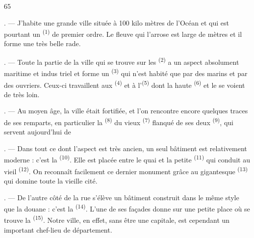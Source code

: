 \begin{VUpage}[67]{65}
\VUsaut{2.0mm}
\VUsaut{3.0mm}
\VUfilet{16mm}
\VUsaut{5.6mm}
\VUsaut{1.4mm}
\VUsaut{2.2mm}

. --- J'habite une grande ville située à 100 kilo\cc
mètres de l'Océan et qui est pourtant un \textsuperscript{(1)} de\nl
premier ordre. Le fleuve qui l'arrose est large de mètres et il forme une très belle rade.

. --- Toute la partie de la ville qui se trouve sur les\nl
{}\textsuperscript{(2)} a un aspect absolument maritime et indus\cc
triel et forme un \textsuperscript{(3)} qui n'est habité que par\nl
des marins et par des ouvriers. Ceux-ci travaillent aux\nl
{}\textsuperscript{(4)} et à l'\textsuperscript{(5)} dont la haute\nl
{}\textsuperscript{(6)} et le  se voient de très loin.

. --- Au moyen âge, la ville était fortifiée, et l'on\nl
rencontre encore quelques traces de ses remparts, en\nl
particulier la \textsuperscript{(8)} du vieux \textsuperscript{(7)}\nl
flanqué de ses deux \textsuperscript{(9)}, qui servent aujourd'hui\nl
de 

. --- Dans tout ce  dont l'aspect est très\nl
ancien, un seul bâtiment est relativement moderne :\nl
c'est la \textsuperscript{(10)}. Elle est placée entre le quai et\nl
la petite \textsuperscript{(11)} qui conduit au vieil \textsuperscript{(12)}.\nl
On reconnaît facilement ce dernier monument grâce\nl
au gigantesque \textsuperscript{(13)} qui domine toute la vieille\nl
cité.

. --- De l'autre côté de la rue s'élève un bâtiment\nl
construit dans le même style que la douane : c'est la\nl
{}\textsuperscript{(14)}. L'une de ses façades donne sur une\nl
petite place où se trouve la \textsuperscript{(15)}. Notre\nl
ville, en effet, sans être une capitale, est cependant un\nl
important chef-lieu de département.
\end{VUpage}

